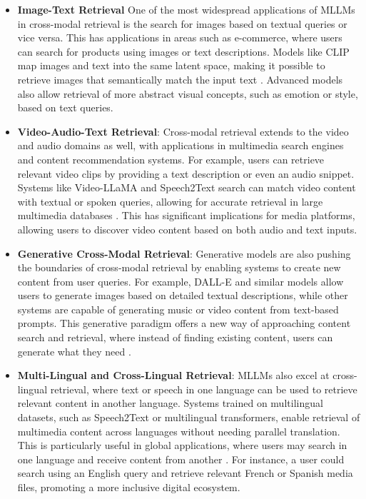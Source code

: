 \documentclass{article}
\begin{document}
\begin{itemize}

\item \textbf{Image-Text Retrieval} One of the most widespread applications of MLLMs in cross-modal retrieval is the search for images based on textual queries or vice versa. This has applications in areas such as e-commerce, where users can search for products using images or text descriptions. Models like CLIP map images and text into the same latent space, making it possible to retrieve images that semantically match the input text \cite{vs2024li}. Advanced models also allow retrieval of more abstract visual concepts, such as emotion or style, based on text queries.

\item \textbf{Video-Audio-Text Retrieval}: Cross-modal retrieval extends to the video and audio domains as well, with applications in multimedia search engines and content recommendation systems. For example, users can retrieve relevant video clips by providing a text description or even an audio snippet. Systems like Video-LLaMA and Speech2Text search can match video content with textual or spoken queries, allowing for accurate retrieval in large multimedia databases \cite{vs2014chen,vs2024gomez}. This has significant implications for media platforms, allowing users to discover video content based on both audio and text inputs.

\item \textbf{Generative Cross-Modal Retrieval}: Generative models are also pushing the boundaries of cross-modal retrieval by enabling systems to create new content from user queries. For example, DALL-E and similar models allow users to generate images based on detailed textual descriptions, while other systems are capable of generating music or video content from text-based prompts. This generative paradigm offers a new way of approaching content search and retrieval, where instead of finding existing content, users can generate what they need \cite{vs2024li,vs2019muller}.

\item \textbf{Multi-Lingual and Cross-Lingual Retrieval}: MLLMs also excel at cross-lingual retrieval, where text or speech in one language can be used to retrieve relevant content in another language. Systems trained on multilingual datasets, such as Speech2Text or multilingual transformers, enable retrieval of multimedia content across languages without needing parallel translation. This is particularly useful in global applications, where users may search in one language and receive content from another \cite{vs2024gomez,vs2024li}. For instance, a user could search using an English query and retrieve relevant French or Spanish media files, promoting a more inclusive digital ecosystem.


\end{itemize}
\end{document}
